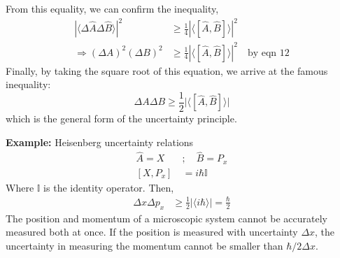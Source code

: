 \documentclass[a4paper, 11pt]{article}
\newcommand{\expect}[1]{\langle #1 \rangle}
\newenvironment{solution}{%
	\begin{list}{}{%
			\setlength{\topsep}{0pt}%
			\setlength{\leftmargin}{1.5cm}%
			\setlength{\rightmargin}{1.5cm}%
			\setlength{\listparindent}{\parindent}%
			\setlength{\itemindent}{\parindent}%
			\setlength{\parsep}{\parskip}%
		}%
		\item[]}{\end{list}}
\begin{document}
	From this equality, we can confirm the inequality, 
		\begin{align*}
			|\expect{\Delta\hat{A}\Delta\hat{B}}|^2 &\geq \frac{1}{4}|\expect{[\hat{A},\hat{B}]}|^2 \\ 
			\Rightarrow (\Delta A)^2(\Delta B)^2 &\geq \frac{1}{4}|\expect{[\hat{A},\hat{B}]}|^2 \quad \text{by eqn 12} 
		\end{align*}
	Finally, by taking the square root of this equation, we arrive at the famous inequality:
		\begin{equation}
			\Delta A \Delta B \geq \frac{1}{2}\Big| \expect{[\hat{A}, \hat{B}]}\Big|
		\end{equation}
	which is the general form of the uncertainty principle.
		\begin{solution}
			\noindent\textbf{Example:} Heisenberg uncertainty relations
				\begin{align}
					\hat{A} = X \quad&;\quad \hat{B}=P_x \\ 
					[X, P_x] &= i\hbar\mathbb{I}
				\end{align}
			Where $\mathbb{I}$ is the identity operator. Then, 
				\begin{align*}
					\Delta x \Delta p_x &\geq \frac{1}{2}|\expect{i\hbar}| = \frac{\hbar}{2}
				\end{align*} 
			The position and momentum of a microscopic system cannot be accurately measured both at once. If the position is measured with uncertainty $\Delta x$, the uncertainty in measuring the momentum cannot be smaller than $\hbar/2\Delta x$. 
		\end{solution}
\end{document}

